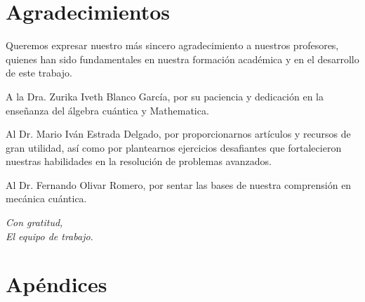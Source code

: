 \documentclass[%
 aip,
 jmp,%
 amsmath,amssymb,
 reprint,
]{revtex4-2}
\begin{document}
\section{Agradecimientos}

Queremos expresar nuestro más sincero agradecimiento a nuestros profesores, quienes han sido fundamentales en nuestra formación académica y en el desarrollo de este trabajo.

A la Dra. Zurika Iveth Blanco García, por su paciencia y dedicación en la enseñanza del álgebra cuántica y Mathematica.

Al Dr. Mario Iván Estrada Delgado, por proporcionarnos artículos y recursos de gran utilidad, así como por plantearnos ejercicios desafiantes que fortalecieron nuestras habilidades en la resolución de problemas avanzados.

Al Dr. Fernando Olivar Romero, por sentar las bases de nuestra comprensión en mecánica cuántica.

\begin{flushright}
\textit{Con gratitud,\\[0.2cm] El equipo de trabajo.}
\end{flushright}

\section{Apéndices}
\end{document}
